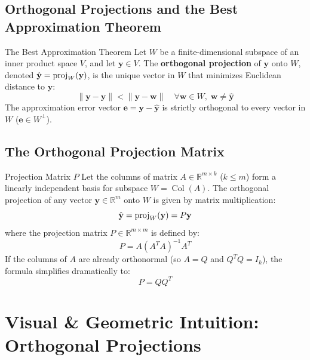 \subsection{Orthogonal Projections and the Best Approximation Theorem}

\begin{theorembox}{The Best Approximation Theorem}
Let $W$ be a finite-dimensional subspace of an inner product space $V$, and let $\mathbf{y} \in V$. The \textbf{orthogonal projection} of $\mathbf{y}$ onto $W$, denoted $\hat{\mathbf{y}} = \operatorname{proj}_W(\mathbf{y})$, is the unique vector in $W$ that minimizes Euclidean distance to $\mathbf{y}$:
\begin{equation}
\|\mathbf{y} - \hat{\mathbf{y}}\| < \|\mathbf{y} - \mathbf{w}\| \quad \forall \mathbf{w} \in W, \; \mathbf{w} \neq \hat{\mathbf{y}}
\end{equation}
The approximation error vector $\mathbf{e} = \mathbf{y} - \hat{\mathbf{y}}$ is strictly orthogonal to every vector in $W$ ($\mathbf{e} \in W^\perp$).
\end{theorembox}

\subsection{The Orthogonal Projection Matrix}

\begin{definitionbox}{Projection Matrix $P$}
Let the columns of matrix $A \in \mathbb{R}^{m \times k}$ ($k \le m$) form a linearly independent basis for subspace $W = \operatorname{Col}(A)$. The orthogonal projection of any vector $\mathbf{y} \in \mathbb{R}^m$ onto $W$ is given by matrix multiplication:
\begin{equation}
\hat{\mathbf{y}} = \operatorname{proj}_W(\mathbf{y}) = P \mathbf{y}
\end{equation}
where the projection matrix $P \in \mathbb{R}^{m \times m}$ is defined by:
\begin{equation}
P = A (A^T A)^{-1} A^T
\end{equation}
If the columns of $A$ are already orthonormal (so $A = Q$ and $Q^T Q = I_k$), the formula simplifies dramatically to:
\begin{equation}
P = Q Q^T
\end{equation}
\end{definitionbox}

\section{Visual \& Geometric Intuition: Orthogonal Projections}

